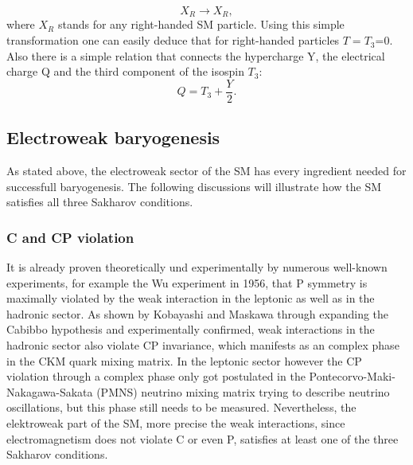\begin{equation*}
	X_R\longrightarrow X_R,
\end{equation*}
where $X_R$ stands for any right-handed SM particle. Using this simple transformation one can easily deduce that for right-handed particles $T=T_3$=0.\newline\indent
Also there is a simple relation that connects the hypercharge Y, the electrical charge Q and the third component of the isospin $T_3$:
\begin{equation}
Q=T_3+\frac{Y}{2}
\label{eq:ladung_hyperladung_isospin}.
\end{equation}
\subsection{Electroweak baryogenesis}
As stated above, the electroweak sector of the SM has every ingredient needed for successfull baryogenesis. The following discussions will illustrate how the SM satisfies all three Sakharov conditions.
\subsubsection{C and CP violation}
It is already proven theoretically und experimentally by numerous well-known experiments, for example the Wu experiment in 1956, that P symmetry is maximally violated by the weak interaction in the leptonic as well as in the hadronic sector. As shown by Kobayashi and Maskawa through expanding the Cabibbo hypothesis and experimentally confirmed, weak interactions in the hadronic sector also violate CP invariance, which manifests as an complex phase in the CKM quark mixing matrix. In the leptonic sector however the CP violation through a complex phase only got postulated in the Pontecorvo-Maki-Nakagawa-Sakata (PMNS) neutrino mixing matrix trying to describe neutrino oscillations, but this phase still needs to be measured.\newline\indent
Nevertheless, the elektroweak part of the SM, more precise the weak interactions, since electromagnetism does not violate C or even P, satisfies at least one of the three Sakharov conditions.\newline\indent

